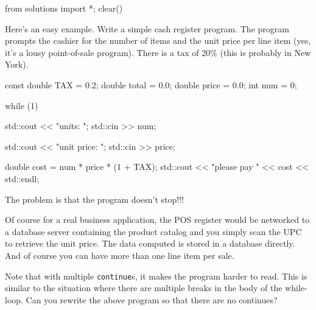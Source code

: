 \begin{python0}
from solutions import *; clear()
\end{python0}

Here's an easy example. Write a simple cash register program. The program prompts the cashier for the number of items and the unit price per line item (yes, it's a lousy point-of-sale program). There is a tax of 20\% (this is probably in New York).

\begin{console}
const double TAX = 0.2;
double total = 0.0;
double price = 0.0;
int num = 0;

while (1)
{     
      std::cout << "units: ";
      std::cin >> num;

      std::cout << "unit price: ";
      std::cin >> price;

      double cost = num * price * (1 + TAX);
      std::cout << "please pay " << cost
                << std::endl;
} 
\end{console}

The problem is that the program doesn't stop!!!

Of course for a real business application, the POS register would be
networked to a database server containing the product catalog and you
simply scan the UPC to retrieve the unit price. The data computed is
stored in a database directly. And of course you can have more than one
line item per sale.

Note that with multiple \texttt{continue}s, it makes the program harder to
read. This is similar to the situation where there are multiple breaks
in the body of the while-loop. Can you rewrite the above program so that
there are no continues?

